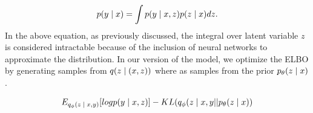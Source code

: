 \begin{equation}
p(y \; | \;{x})  = \int p(y \; | \;{x,z}) p(z \; | \;{x}) dz.
\end{equation}
In the above equation, as previously discussed, the integral over latent variable $z$ is considered intractable because of the inclusion of neural networks to approximate the distribution. In our version of the model, we optimize the \ac{ELBO} by generating samples from $q(z \; | \;(x,z))$ where as \cite{Zhang2016VNMT} samples from the prior $p_{\theta}(z \; | \;{x})$.  %

\begin{equation}
E_{q_{\phi}(z \; | \;{x, y})}  [logp(y \; | \;{x, z} ) ] - KL (q_{\phi}(z \; | \;{x, y} || p_{\theta}(z \; | \;{x}))
\end{equation}











